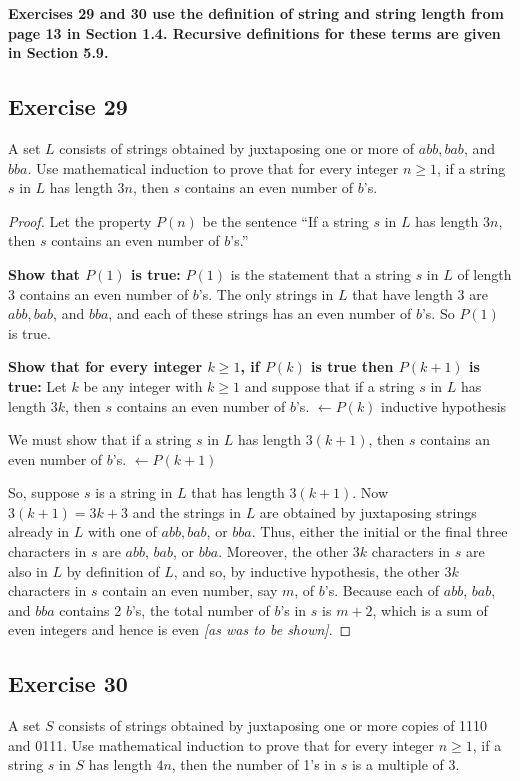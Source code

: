 \documentclass[14pt]{extarticle}
\newcommand{\from}{\leftarrow}
\newcommand{\cy}{\color{cyan}}
\begin{document}
{\bf \cy Exercises 29 and 30 use the definition of string and string length from page 13 in Section 1.4. Recursive definitions for these terms are given in Section 5.9.}

\subsection{Exercise 29}
A set $L$ consists of strings obtained by juxtaposing one or more of $abb, bab$, and $bba$. Use mathematical induction to prove that for every integer $n \geq 1$, if a string $s$ in $L$ has length $3n$, then $s$ contains an even number of $b$’s.

\begin{proof}
Let the property $P(n)$ be the sentence “If a string $s$ in $L$ has length $3n$, then $s$ contains an even number of $b$’s.” 

{\bf Show that $P(1)$ is true:} $P(1)$ is the statement that a string $s$ in $L$ of length 3 contains an even number of $b$’s. The only strings in $L$ that have length 3 are $abb, bab$, and $bba$, and each of these strings has an even number of $b$’s. So $P(1)$ is true.

{\bf Show that for every integer $k \geq 1$, if $P(k)$ is true then $P(k + 1)$ is true:} Let $k$ be any integer with $k \geq 1$ and suppose that if a string $s$ in $L$ has length $3k$, then $s$ contains an even number of $b$’s. {\cy $\from P(k)$ inductive hypothesis}

We must show that if a string $s$ in $L$ has length $3(k + 1)$, then $s$ contains an even number of $b$’s. {\cy $\from P(k + 1)$} 

So, suppose $s$ is a string in $L$ that has length $3(k + 1)$. Now $3(k + 1) = 3k + 3$ and the strings in $L$ are obtained by juxtaposing strings already in $L$ with one of $abb, bab$, or $bba$. Thus, either the initial or the final three characters in $s$ are $abb$, $bab$, or $bba$. Moreover, the other $3k$ characters in $s$ are also in $L$ by definition of $L$, and so, by inductive hypothesis, the other $3k$ characters in $s$ contain an even number, say $m$, of $b$’s. Because each of $abb$, $bab$, and $bba$ contains 2 $b$’s, the total number of $b$’s in $s$ is $m + 2$, which is a sum of even integers and hence is even {\it [as was to be shown]}. 
\end{proof}

\subsection{Exercise 30}
A set $S$ consists of strings obtained by juxtaposing one or more copies of 1110 and 0111. Use mathematical induction to prove that for every integer $n \geq 1$, if a string $s$ in $S$ has length $4n$, then the number of 1’s in $s$ is a multiple of 3.
\end{document}
